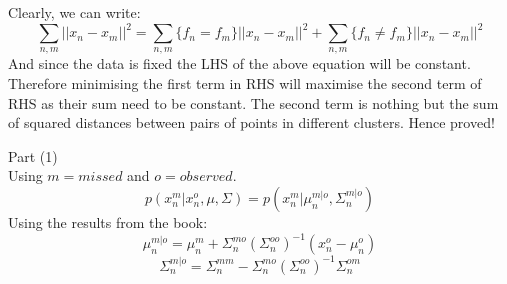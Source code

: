 \documentclass[a4paper,11pt]{article}
\begin{document}
\begin{mlsolution}
\noindent
Clearly, we can write:
\begin{equation}
  \sum_{n, m}||x_{n} - x_{m}||^{2} = \sum_{n, m}\{f_{n} = f_{m}\}||x_{n} - x_{m}||^{2}
                                   + \sum_{n, m}\{f_{n} \neq f_{m}\}||x_{n} - x_{m}||^{2}
\end{equation}
And since the data is fixed the LHS of the above equation will be constant. Therefore minimising the first term in RHS will maximise the second term of RHS as their sum need to be constant. The second term is nothing but the sum of squared distances between pairs of points in different clusters. Hence proved!


\end{mlsolution}

\begin{mlsolution}
\noindent
Part (1) \\
Using $ m = missed $ and $o = observed$.
\begin{equation}
  p(x_{n}^{m}|x_{n}^{o}, \mu, \Sigma) = p(x_{n}^{m}| \mu_{n}^{m|o}, \Sigma_{n}^{m|o} )
\end{equation}
Using the results from the book:
\begin{equation}
  \mu_{n}^{m|o} = \mu_{n}^{m} + \Sigma_{n}^{mo}(\Sigma_{n}^{oo})^{-1}(x_{n}^{o} - \mu_{n}^{o})
\end{equation}
\begin{equation}
  \Sigma_{n}^{m|o} = \Sigma_{n}^{mm} - \Sigma_{n}^{mo}(\Sigma_{n}^{oo})^{-1}\Sigma_{n}^{om}
\end{equation}


\end{mlsolution}
\end{document}
